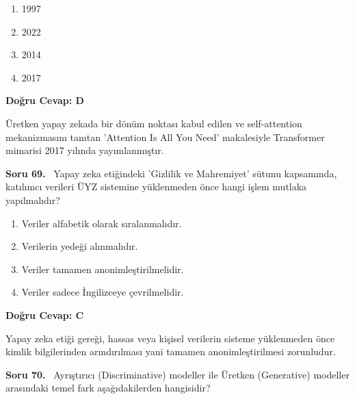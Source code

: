 \documentclass[11pt,a4paper,openany]{book}
\begin{document}
\begin{enumerate}[label=\Alph*), leftmargin=25pt, topsep=4pt, itemsep=2pt]
        \item 1997
        \item 2022
        \item 2014
        \item 2017
\end{enumerate}

\vspace{4pt}
\begin{tcolorbox}[title=Cevap ve Açıklama, colback=gray!3!white, colframe=primarycolor!90!black, arc=2mm, fonttitle=\bfseries\sffamily, top=6pt, bottom=6pt]
    \textbf{Doğru Cevap: D}

    \vspace{2pt}
    Üretken yapay zekada bir dönüm noktası kabul edilen ve self-attention mekanizmasını tanıtan 'Attention Is All You Need' makalesiyle Transformer mimarisi 2017 yılında yayımlanmıştır.
\end{tcolorbox}
\vspace{10pt}
\needspace{5cm}
\vspace{8pt}
\noindent\textbf{\large\sffamily Soru 69.} \ Yapay zeka etiğindeki 'Gizlilik ve Mahremiyet' sütunu kapsamında, katılımcı verileri ÜYZ sistemine yüklenmeden önce hangi işlem mutlaka yapılmalıdır?

\begin{enumerate}[label=\Alph*), leftmargin=25pt, topsep=4pt, itemsep=2pt]
        \item Veriler alfabetik olarak sıralanmalıdır.
        \item Verilerin yedeği alınmalıdır.
        \item Veriler tamamen anonimleştirilmelidir.
        \item Veriler sadece İngilizceye çevrilmelidir.
\end{enumerate}

\vspace{4pt}
\begin{tcolorbox}[title=Cevap ve Açıklama, colback=gray!3!white, colframe=primarycolor!90!black, arc=2mm, fonttitle=\bfseries\sffamily, top=6pt, bottom=6pt]
    \textbf{Doğru Cevap: C}

    \vspace{2pt}
    Yapay zeka etiği gereği, hassas veya kişisel verilerin sisteme yüklenmeden önce kimlik bilgilerinden arındırılması yani tamamen anonimleştirilmesi zorunludur.
\end{tcolorbox}
\vspace{10pt}
\needspace{5cm}
\vspace{8pt}
\noindent\textbf{\large\sffamily Soru 70.} \ Ayrıştırıcı (Discriminative) modeller ile Üretken (Generative) modeller arasındaki temel fark aşağıdakilerden hangisidir?
\end{document}
